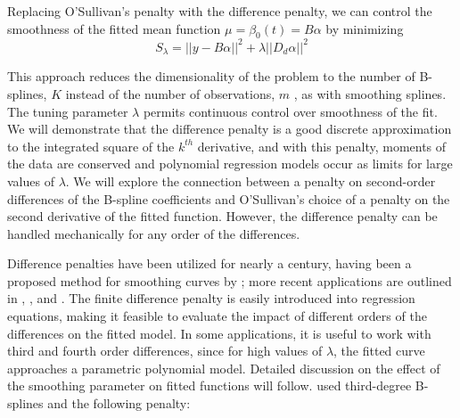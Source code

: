 \documentclass[12pt]{article}
\theoremstyle{definition}
\begin{document}
Replacing O'Sullivan's penalty with the difference penalty, we can control the smoothness of the fitted mean function $\mu = \beta_0\left( t \right) = B\alpha$ by minimizing
\begin{equation*} 
S_\lambda = \vert \vert y- B \alpha \vert \vert^2 + \lambda\vert \vert D_d\alpha \vert \vert^2
\end{equation*}

This approach reduces the dimensionality of the problem to the number of B-splines, $K$ instead of the number of observations, $m$ , as with smoothing splines. The tuning parameter $\lambda$ permits continuous control over smoothness of the fit. We will demonstrate that the difference penalty is a good discrete approximation to the integrated square of the $k^{th}$ derivative, and with this penalty, moments of the data are conserved and polynomial regression models occur as limits for large values of $\lambda$. We will explore the connection between a penalty on second-order differences of the B-spline coefficients and O'Sullivan's choice of a penalty on the second derivative of the fitted function. However, the difference penalty can be handled mechanically for any order of the differences.

Difference penalties have been utilized for nearly a century, having been a proposed method for smoothing curves by \cite{whittaker1922new}; more recent applications are outlined in  \cite{eilers1991penalized}, \cite{eilers1991nonparametric}, and \cite{eilers1995indirect}. The finite difference penalty is easily introduced into regression equations, making it feasible to evaluate the impact of different orders of the differences on the fitted model. In some applications, it is useful to work with third and fourth order differences, since for high values of $\lambda$, the fitted curve approaches a parametric polynomial model. Detailed discussion on the effect of the smoothing parameter on fitted functions will follow. \cite{o1986statistical} used third-degree B-splines and the following penalty:
\end{document}
